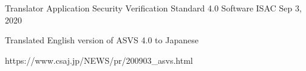 

\begin{cventries}

  \cventry
    {Translator} %
    {Application Security Verification Standard 4.0} %
    {Software ISAC} %
    {Sep 3, 2020} %
    {
      \begin{cvitems} %
        \item {Translated English version of ASVS 4.0 to Japanese}
        \item {https://www.csaj.jp/NEWS/pr/200903\_asvs.html}
      \end{cvitems}
    }

\end{cventries}
